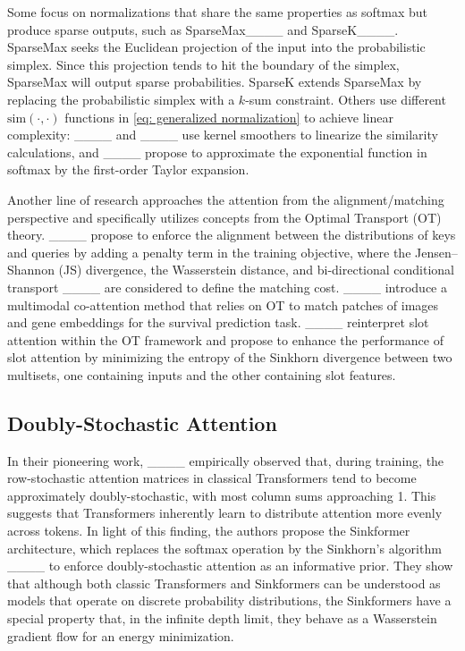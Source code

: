 Some focus on normalizations that share the same properties as softmax but produce sparse outputs, such as SparseMax____ and SparseK____. SparseMax seeks the Euclidean projection of the input into the probabilistic simplex. Since this projection tends to hit the boundary of the simplex, SparseMax will output sparse probabilities. SparseK extends SparseMax by replacing the probabilistic simplex with a $k$-sum constraint. Others use different $\text{sim}(\cdot, \cdot)$ functions in \eqref{eq: generalized normalization} to achieve linear complexity: ____ and ____ use kernel smoothers to linearize the similarity calculations, and ____ propose to approximate the exponential function in softmax by the first-order Taylor expansion. 

Another line of research approaches the attention from the alignment/matching perspective and specifically utilizes concepts from the Optimal Transport (OT) theory. ____ propose to enforce the alignment between the distributions of keys and queries by adding a penalty term in the training objective, where the Jensen–Shannon (JS) divergence, the Wasserstein distance, and bi-directional conditional transport ____ are considered to define the matching cost. ____ introduce a multimodal co-attention method that relies on OT to match patches of images and gene embeddings for the survival prediction task. ____ reinterpret slot attention within the OT framework and propose to enhance the performance of slot attention by minimizing the entropy of the Sinkhorn divergence between two multisets, one containing inputs and the other containing slot features.

\subsection{Doubly-Stochastic Attention}

In their pioneering work, ____ empirically observed that, during training, the row-stochastic attention matrices in classical Transformers tend to become approximately doubly-stochastic, with most column sums approaching 1. This suggests that Transformers inherently learn to distribute attention more evenly across tokens. In light of this finding, the authors propose the Sinkformer architecture, which replaces the softmax operation by the Sinkhorn's algorithm ____ to enforce doubly-stochastic attention as an informative prior. They show that although both classic Transformers and Sinkformers can be understood as models that operate on discrete probability distributions, the Sinkformers have a special property that, in the infinite depth limit, they behave as a Wasserstein gradient flow for an energy minimization.

